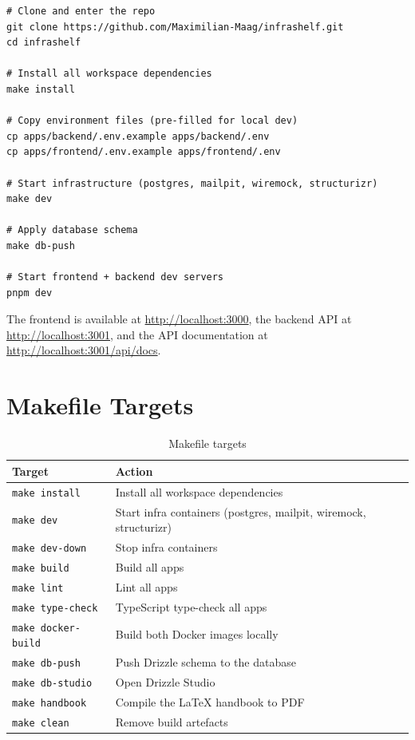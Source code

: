 \documentclass[12pt,a4paper,twoside]{report}
\newcommand{\code}[1]{\texttt{#1}}
\begin{document}
\begin{lstlisting}[style=bash]
# Clone and enter the repo
git clone https://github.com/Maximilian-Maag/infrashelf.git
cd infrashelf

# Install all workspace dependencies
make install

# Copy environment files (pre-filled for local dev)
cp apps/backend/.env.example apps/backend/.env
cp apps/frontend/.env.example apps/frontend/.env

# Start infrastructure (postgres, mailpit, wiremock, structurizr)
make dev

# Apply database schema
make db-push

# Start frontend + backend dev servers
pnpm dev
\end{lstlisting}

The frontend is available at \url{http://localhost:3000}, the backend API at
\url{http://localhost:3001}, and the API documentation at
\url{http://localhost:3001/api/docs}.

\section{Makefile Targets}

\begin{table}[H]
  \centering
  \caption{Makefile targets}
  \begin{tabular}{@{}ll@{}}
    \toprule
    \textbf{Target} & \textbf{Action} \\
    \midrule
    \code{make install}      & Install all workspace dependencies \\
    \code{make dev}          & Start infra containers (postgres, mailpit, wiremock, structurizr) \\
    \code{make dev-down}     & Stop infra containers \\
    \code{make build}        & Build all apps \\
    \code{make lint}         & Lint all apps \\
    \code{make type-check}   & TypeScript type-check all apps \\
    \code{make docker-build} & Build both Docker images locally \\
    \code{make db-push}      & Push Drizzle schema to the database \\
    \code{make db-studio}    & Open Drizzle Studio \\
    \code{make handbook}         & Compile the LaTeX handbook to PDF \\
    \code{make clean}        & Remove build artefacts \\
    \bottomrule
  \end{tabular}
\end{table}
\end{document}
